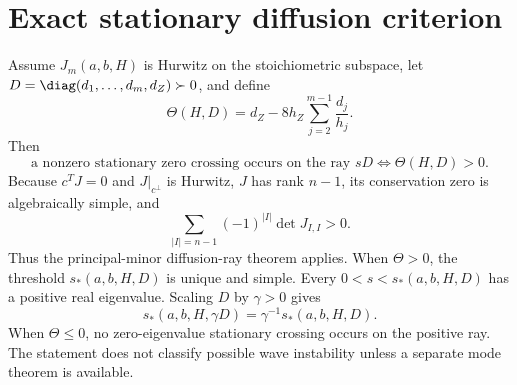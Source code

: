 \section*{Exact stationary diffusion criterion}
Assume $J_m(a,b,H)$ is Hurwitz on the stoichiometric subspace, let
$D=\diag(d_1,\ldots,d_m,d_Z)\succ0$, and define
\[
\Theta(H,D)=d_Z-8h_Z\sum_{j=2}^{m-1}\frac{d_j}{h_j}.
\]
Then
\[
\boxed{\text{a nonzero stationary zero crossing occurs on the ray }sD
\iff \Theta(H,D)>0.}
\]
Because $c^TJ=0$ and $J|_{c^\perp}$ is Hurwitz, $J$ has rank $n-1$, its
conservation zero is algebraically simple, and
\[
 \sum_{|I|=n-1}(-1)^{|I|}\det J_{I,I}>0.
\]
Thus the principal-minor diffusion-ray theorem applies.  When $\Theta>0$,
the threshold $s_*(a,b,H,D)$ is unique and simple.  Every
$0<s<s_*(a,b,H,D)$ has a positive real eigenvalue.  Scaling $D$ by
$\gamma>0$ gives
\[
 s_*(a,b,H,\gamma D)=\gamma^{-1}s_*(a,b,H,D).
\]
When $\Theta\le0$, no
zero-eigenvalue stationary crossing occurs on the positive ray.  The statement
does not classify possible wave instability unless a separate mode theorem is
available.
